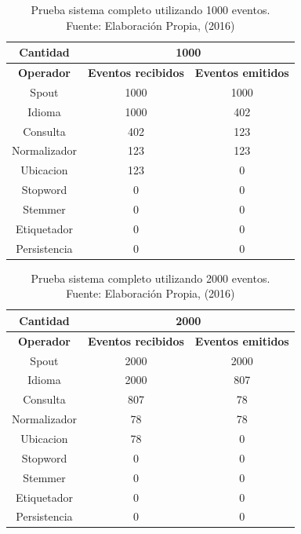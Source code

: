 \begin{table}[H]
\centering
\caption[Prueba sistema completo utilizando 1000 eventos.]{Prueba sistema completo utilizando 1000 eventos.\\Fuente: Elaboración Propia, (2016)}
\label{PruebaSistFull1000}
\begin{tabular}{|c|c|c|}
\hline
\textbf{Cantidad} & \multicolumn{2}{c|}{\textbf{1000}} \\ \hline
\textbf{Operador} & \multicolumn{1}{c|}{\textbf{Eventos recibidos}} & \multicolumn{1}{c|}{\textbf{Eventos emitidos}} \\ \hline
Spout & 1000 & 1000 \\ \hline
Idioma & 1000 & 402 \\ \hline
Consulta & 402 & 123 \\ \hline
Normalizador & 123 & 123 \\ \hline
Ubicacion & 123 & 0 \\ \hline
Stopword & 0 & 0 \\ \hline
Stemmer & 0 & 0 \\ \hline
Etiquetador & 0 & 0 \\ \hline
Persistencia & 0 & 0 \\ \hline
\end{tabular}
\end{table}

\begin{table}[H]
\centering
\caption[Prueba sistema completo utilizando 2000 eventos.]{Prueba sistema completo utilizando 2000 eventos.\\Fuente: Elaboración Propia, (2016)}
\label{PruebaSistFull2000}
\begin{tabular}{|c|c|c|}
\hline
\textbf{Cantidad} & \multicolumn{2}{c|}{\textbf{2000}} \\ \hline
\textbf{Operador} & \multicolumn{1}{c|}{\textbf{Eventos recibidos}} & \multicolumn{1}{c|}{\textbf{Eventos emitidos}} \\ \hline
Spout & 2000 & 2000 \\ \hline
Idioma & 2000 & 807 \\ \hline
Consulta & 807 & 78 \\ \hline
Normalizador & 78 & 78 \\ \hline
Ubicacion & 78 & 0 \\ \hline
Stopword & 0 & 0 \\ \hline
Stemmer & 0 & 0 \\ \hline
Etiquetador & 0 & 0 \\ \hline
Persistencia & 0 & 0 \\ \hline
\end{tabular}
\end{table}

